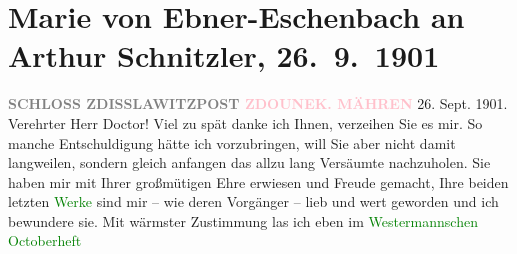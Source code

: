 

               \section[Marie von Ebner-Eschenbach an Arthur Schnitzler, 26. 9. 1901]{ Marie von Ebner-Eschenbach an Arthur Schnitzler, 26. 9. 1901}\nopagebreak{}\rehead{ }\normalsize\beginnumbering{} \toendnotes[C]{\smallbreak\pagebreak[2]} 
\toendnotes[C]{\smallbreak}\pstart
           \noindent{}\raggedleft{}{\pb}\textcolor{pink}{\textcolor{gray}{\textbf{SCHLOSS ZDISSLAWITZ}}}{}\ledrightnote{\textcolor{pink}{Schloss Zdislavice}}{\\}\textcolor{gray}{\textbf{POST \textcolor{pink}{ZDOUNEK. MÄHREN}{}\ledrightnote{\textcolor{pink}{Zdounky}}}}\pend
           \pstart
           \raggedleft{}26. Sept. 1901.\pend
           \pstart\center{}Verehrter Herr Doctor!\pend\pstart
           Viel zu spät danke ich Ihnen, verzeihen Sie es mir. So manche Entschuldigung hätte
               ich vorzubringen, will Sie aber nicht damit langweilen, sondern gleich anfangen das
               allzu lang Versäumte nachzuholen. Sie haben mir mit Ihrer großmütigen \label{K_L02581-1v}\label{K_L02581-1h} Ehre erwiesen und
               Freude gemacht, Ihre beiden letzten \textcolor{green}{Werke}{} sind mir – wie deren Vorgänger – lieb und
               wert geworden und ich bewundere sie. Mit wärmster Zustimmung {\pb}las ich eben im \textcolor{green}{Westermannschen Octoberheft}{}\ledrightnote{\textcolor{green}{Westermanns Monatshefte}}
